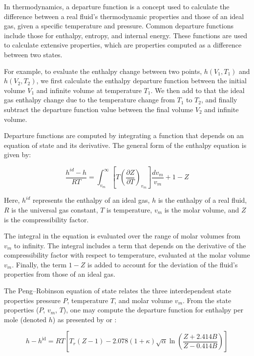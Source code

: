 \documentclass[../Article_Model_Parameters.tex]{subfiles}
\begin{document}
	In thermodynamics, a departure function is a concept used to calculate the difference between a real fluid's thermodynamic properties and those of an ideal gas, given a specific temperature and pressure. Common departure functions include those for enthalpy, entropy, and internal energy. These functions are used to calculate extensive properties, which are properties computed as a difference between two states.
	
	For example, to evaluate the enthalpy change between two points, $h(V_1,T_1)$ and $h(V_2,T_2)$, we first calculate the enthalpy departure function between the initial volume $V_1$ and infinite volume at temperature $T_1$. We then add to that the ideal gas enthalpy change due to the temperature change from $T_1$ to $T_2$, and finally subtract the departure function value between the final volume $V_2$ and infinite volume.
	
	Departure functions are computed by integrating a function that depends on an equation of state and its derivative. The general form of the enthalpy equation is given by:
	
	{\footnotesize
		\begin{equation}
			\frac{h^{id}-h}{RT} =\int_{v_m}^{\infty }\left[T\left({\frac{\partial Z}{\partial T}}\right)_{v_m}\right]{\frac{dv_m}{v_m}} + 1-Z
		\end{equation}
	}
	
	Here, $h^{id}$ represents the enthalpy of an ideal gas, $h$ is the enthalpy of a real fluid, $R$ is the universal gas constant, $T$ is temperature, $v_m$ is the molar volume, and $Z$ is the compressibility factor.
	
	The integral in the equation is evaluated over the range of molar volumes from $v_m$ to infinity. The integral includes a term that depends on the derivative of the compressibility factor with respect to temperature, evaluated at the molar volume $v_m$. Finally, the term $1-Z$ is added to account for the deviation of the fluid's properties from those of an ideal gas.

	The Peng–Robinson equation of state relates the three interdependent state properties pressure $P$, temperature $T$, and molar volume $v_m$. From the state properties ($P$, $v_m$, $T$), one may compute the departure function for enthalpy per mole (denoted $h$) as presented by \citet{Gmehling2019} or \citet{Elliott2011}:
	
	{\footnotesize
		\begin{equation}
			h-h^{\mathrm {id} }=RT\left[T_{r}(Z-1)-2.078(1+\kappa ){\sqrt {\alpha }}\ln \left({\frac {Z+2.414B}{Z-0.414B}}\right)\right]
		\end{equation}
	}
	
	
\end{document}
